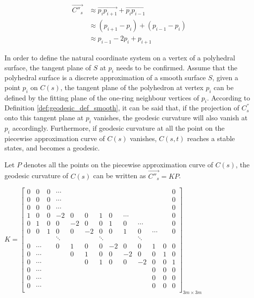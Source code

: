 \begin{equation}
\begin{split}
\vec{C''_{s}} & \approx  \overrightarrow{p_{i}p_{i+1}}+\overrightarrow{p_{i}p_{i-1}} \\
 &\approx (p_{i+1} - p_{i}) + (p_{i-1} - p_{i})\\ 
 & \approx p_{i-1} - 2p_{i} + p_{i+1}
\end{split}
\label{equation:piecewise_curvature}
\end{equation}

In order to define the natural coordinate system on a vertex of a polyhedral surface, the tangent plane of $S$ at $p_{i}$ needs to be confirmed. Assume that the polyhedral surface is a discrete approximation of a smooth surface $S$,  given a point $p_{i}$ on $C(s)$, the tangent plane of the polyhedron at vertex $p_{i}$ can be defined by the fitting plane of the one-ring neighbour vertices of $p_{i}$. According to Definition \ref{def:geodesic_def_smooth}, it can be said that, if the projection of $C^{''}_{s}$ onto this tangent plane at $p_{i}$ vanishes, the geodesic curvature will also vanish at $p_{i}$ accordingly. Furthermore, if geodesic curvature at all the point on the piecewise approximation curve of $C(s)$ vanishes, $C(s,t)$ reaches a stable states, and becomes a geodesic.

Let $P$ denotes all the points on the piecewise approximation curve of $C(s)$, the geodesic curvature of $C(s)$ can be written as $\vec{C''_{s}}= KP$.

\setcounter{MaxMatrixCols}{14}
$K=
\begin{bmatrix}

 0&	 0&  0& \cdots &&&&&&&&&0\\
 0&	 0&  0& \cdots &&&&&&&&&0\\
 0&	 0&  0& \cdots &&&&&&&&&0\\
 1&  0&  0& -2&  0&  0&  1&  0&   \cdots &  &  &  & 0\\
 0&  1&  0&  0&  -2&  0&  0&  1&  0&  \cdots &  &  & 0\\
 0&  0&  1&  0&  0&  -2&  0&  0&  1&  0&  \cdots &  & 0\\
  &   &	  &\ddots &    &   &\ddots   &   &   &\ddots   &   &   &\\	
 
 
 
 0&\cdots  &  &  0&  1&  0&  0&  -2&  0&  0&  1&  0&  0\\
 0&\cdots  &  &  &  0&  1&  0&  0&  -2&  0&  0&  1&  0\\
 0&\cdots  &  &  &  &  0&  1&  0&  0&  -2&  0&  0&  1 \\
 0&\cdots&&&&&&&&& 0& 0& 0\\
 0&\cdots&&&&&&&&& 0& 0& 0\\
 0&\cdots&&&&&&&&& 0& 0& 0\\

\end{bmatrix}_{3m\times 3m}$

